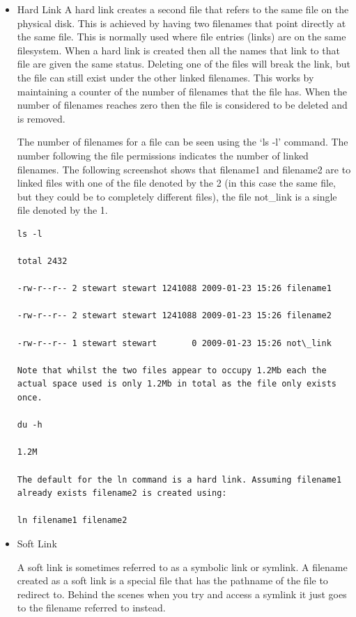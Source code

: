 \documentclass{article}
\begin{document}
\begin{itemize}
\item Hard Link
A hard link creates a second file that refers to the same file on the physical disk. This is achieved by having two filenames that point directly at the same file. This is normally used where file entries (links) are on the same filesystem. When a hard link is created then all the names that link to that file are given the same status. Deleting one of the files will break the link, but the file can still exist under the other linked filenames. This works by maintaining a counter of the number of filenames that the file has. When the number of filenames reaches zero then the file is considered to be deleted and is removed.

	The number of filenames for a file can be seen using the `ls -l' command. The number following the file permissions indicates the number of linked filenames. The following screenshot shows that filename1 and filename2 are to linked files with one of the file denoted by the 2 (in this case the same file, but they could be to completely different files), the file not\_link is a single file denoted by the 1.
\begin{verbatim}	
ls -l

total 2432

-rw-r--r-- 2 stewart stewart 1241088 2009-01-23 15:26 filename1

-rw-r--r-- 2 stewart stewart 1241088 2009-01-23 15:26 filename2

-rw-r--r-- 1 stewart stewart       0 2009-01-23 15:26 not\_link

Note that whilst the two files appear to occupy 1.2Mb each the actual space used is only 1.2Mb in total as the file only exists once.

du -h

1.2M

The default for the ln command is a hard link. Assuming filename1 already exists filename2 is created using:

ln filename1 filename2

\end{verbatim}

\item Soft Link

A soft link is sometimes referred to as a symbolic link or symlink. A filename created as a soft link is a special file that has the pathname of the file to redirect to. Behind the scenes when you try and access a symlink it just goes to the filename referred to instead.


\end{itemize}
\end{document}
